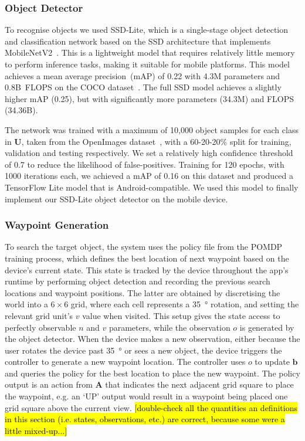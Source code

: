 \documentclass[runningheads]{llncs}
\DeclareRobustCommand{\tofix}[1]{{\sethlcolor{yellow}\hl{[#1]}}}
\begin{document}
\subsubsection{Object Detector}
To recognise objects we used SSD-Lite, which is a single-stage object detection and classification network based on the SSD architecture that implements MobileNetV2~\cite{sandler2018mobilenetv2}.
This is a lightweight model that requires relatively little memory to perform inference tasks, making it suitable for mobile platforms. 
This model achieves a mean average precision~(mAP) of 0.22 with 4.3M parameters and 0.8B~FLOPS on the COCO dataset~\cite{li2018tinydsod}.
The full SSD model achieves a slightly higher mAP (0.25), but with significantly more parameters (34.3M) and FLOPS (34.36B).

The network was trained with a maximum of 10,000 object samples for each class in $\mathbf{U}$, taken from the OpenImages dataset~\cite{openimages}, with a 60-20-20\% split for training, validation and testing respectively.
We set a relatively high confidence threshold of 0.7 to reduce the likelihood of false-positives.
Training for 120 epochs, with 1000 iterations each, we achieved a mAP of 0.16 on this dataset and produced a TensorFlow Lite model that is Android-compatible. We used this model to finally implement our SSD-Lite object detector on the mobile device.

\subsubsection{Waypoint Generation}
To search the target object, the system uses the policy file from the POMDP training process, which defines the best location of next waypoint based on the device's current state.
This state is tracked by the device throughout the app's runtime by performing object detection and recording the previous search locations and waypoint positions.
The latter are obtained by discretising the world into a $6\times6$ grid, where each cell represents a \SI{35}{\degree} rotation, and setting the relevant grid unit's $v$ value when visited.
This setup gives the state access to perfectly observable $n$ and $v$ parameters, while the observation $o$ is generated by the object detector. 
When the device makes a new observation, either because the user rotates the device past \SI{35}{\degree} or sees a new object, the device triggers the controller to generate a new waypoint location.
The controller uses $o$ to update $\mathbf{b}$ and queries the policy for the best location to place the new waypoint. 
The policy output is an action from $\mathbf{A}$ that indicates the next adjacent grid square to place the waypoint, e.g. an `UP' output would result in a waypoint being placed one grid square above the current view. 
\tofix{double-check all the quantities an definitions in this section (i.e. states, observations, etc.) are correct, because some were a little mixed-up...}
\end{document}
